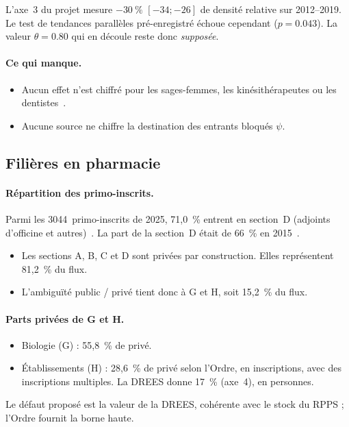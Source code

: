 L'axe~3 du projet mesure $-30~\%$\mesure{} $[-34 ; -26]$ de densité
relative sur 2012--2019. Le test de tendances parallèles pré-enregistré
échoue cependant ($p = \num{0.043}$\mesure{}). La valeur $\theta = \num{0.80}$
qui en découle reste donc \emph{supposée}\suppose{}.

\paragraph{Ce qui manque.}
\begin{itemize}
\item Aucun effet n'est chiffré pour les sages-femmes, les kinésithérapeutes
  ou les dentistes~\cite{a1-igas2023,a1-ccomptes2024}.
\item Aucune source ne chiffre la destination des entrants bloqués $\psi$.
\end{itemize}

\subsection{Filières en pharmacie}

\paragraph{Répartition des primo-inscrits.}
Parmi les \num{3044}~primo-inscrits de 2025, 71,0~\% entrent en section~D
(adjoints d'officine et autres)~\cite{a1-cnop2025}. La part de la section~D
était de 66~\% en 2015~\cite{a1-cnop2016}.
\begin{itemize}
\item Les sections A, B, C et D sont privées par construction. Elles
  représentent 81,2~\%\derive{} du flux.
\item L'ambiguïté public / privé tient donc à G et H, soit 15,2~\%\derive{}
  du flux.
\end{itemize}

\paragraph{Parts privées de G et H.}
\begin{itemize}
\item Biologie (G) : 55,8~\%\derive{} de privé.
\item Établissements (H) : 28,6~\%\derive{} de privé selon l'Ordre, en
  inscriptions, avec des inscriptions multiples. La DREES donne 17~\%
  (axe~4), en personnes.
\end{itemize}
Le défaut proposé est la valeur de la DREES, cohérente avec le stock du
RPPS ; l'Ordre fournit la borne haute.

